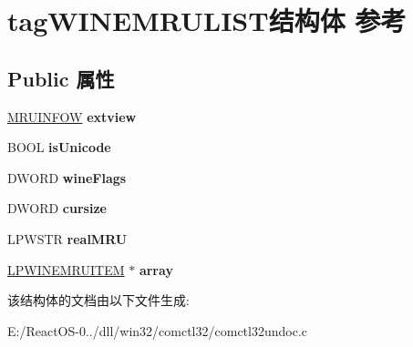 \hypertarget{structtag_w_i_n_e_m_r_u_l_i_s_t}{}\section{tag\+W\+I\+N\+E\+M\+R\+U\+L\+I\+S\+T结构体 参考}
\label{structtag_w_i_n_e_m_r_u_l_i_s_t}
\subsection*{Public 属性}
\begin{DoxyCompactItemize}
\item 
\mbox{\label{structtag_w_i_n_e_m_r_u_l_i_s_t_ade0cd3e1be42552381317c1e6ec3c731}} 
\hyperlink{structtag_m_r_u_i_n_f_o_w}{M\+R\+U\+I\+N\+F\+OW} {\bfseries extview}
\item 
\mbox{\label{structtag_w_i_n_e_m_r_u_l_i_s_t_a3be757fec66ec4f67ec716b1beeea971}} 
B\+O\+OL {\bfseries is\+Unicode}
\item 
\mbox{\label{structtag_w_i_n_e_m_r_u_l_i_s_t_a7f3896e6549cc54cdd89de9fe62febbc}} 
D\+W\+O\+RD {\bfseries wine\+Flags}
\item 
\mbox{\label{structtag_w_i_n_e_m_r_u_l_i_s_t_ab49aa85ea55de5a87305b9c3931f4921}} 
D\+W\+O\+RD {\bfseries cursize}
\item 
\mbox{\label{structtag_w_i_n_e_m_r_u_l_i_s_t_a6b8d7f7c8b37b6ab5b900dfb92041463}} 
L\+P\+W\+S\+TR {\bfseries real\+M\+RU}
\item 
\mbox{\label{structtag_w_i_n_e_m_r_u_l_i_s_t_a4064f4046a0fdc4a7882e6c47c8cce43}} 
\hyperlink{structtag_w_i_n_e_m_r_u_i_t_e_m}{L\+P\+W\+I\+N\+E\+M\+R\+U\+I\+T\+EM} $\ast$ {\bfseries array}
\end{DoxyCompactItemize}


该结构体的文档由以下文件生成\+:\begin{DoxyCompactItemize}
\item 
E\+:/\+React\+O\+S-\/0../dll/win32/comctl32/comctl32undoc.\+c\end{DoxyCompactItemize}
